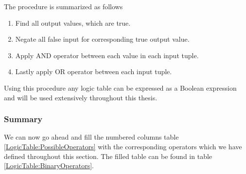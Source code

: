                 The procedure is summarized as follows
                \begin{enumerate}
                    \item Find all output values, which are true.
                    \item Negate all false input for corresponding true output value.
                    \item Apply AND operator between each value in each input tuple.
                    \item Lastly apply OR operator between each input tuple.
                \end{enumerate}
                Using this procedure any logic table can be expressed as a Boolean expression and will be used extensively throughout this thesis.
                
                
            \subsubsection{Summary}
            
                We can now go ahead and fill the numbered columns table \ref{LogicTable:PossibleOperators} with the corresponding operators which we have defined throughout this section. The filled table can be found in table \ref{LogicTable:BinaryOperators}. 
                
